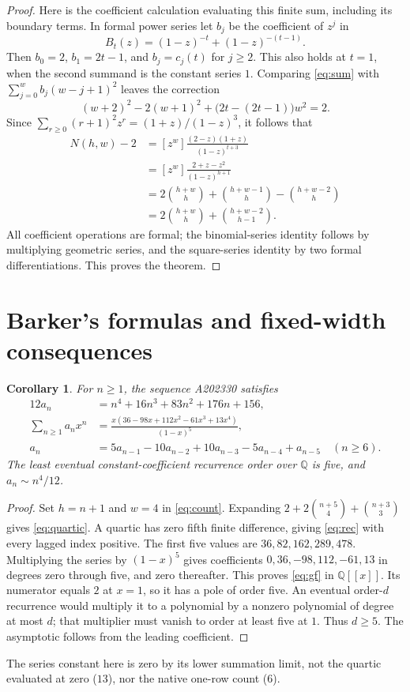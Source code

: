 \documentclass[11pt]{article}
\newtheorem{corollary}[theorem]{Corollary}
\newcommand{\bin}[2]{\binom{#1}{#2}}
\begin{document}
\begin{proof}
Here is the coefficient calculation evaluating this finite sum, including its boundary terms. In formal power series let $b_j$ be the coefficient of $z^j$ in
\[
 B_t(z)=(1-z)^{-t}+(1-z)^{-(t-1)}.
\]
Then $b_0=2$, $b_1=2t-1$, and $b_j=c_j(t)$ for $j\ge2$. This also holds at $t=1$, when the second summand is the constant series $1$. Comparing \eqref{eq:sum} with $\sum_{j=0}^w b_j(w-j+1)^2$ leaves the correction
\[
 (w+2)^2-2(w+1)^2+\bigl(2t-(2t-1)\bigr)w^2=2.
\]
Since $\sum_{r\ge0}(r+1)^2z^r=(1+z)/(1-z)^3$, it follows that
\begin{align*}
 N(h,w)-2
  &=[z^w]\frac{(2-z)(1+z)}{(1-z)^{t+3}}\\
  &=[z^w]\frac{2+z-z^2}{(1-z)^{h+1}}\\
  &=2\bin{h+w}{h}+\bin{h+w-1}{h}-\bin{h+w-2}{h}\\
  &=2\bin{h+w}{h}+\bin{h+w-2}{h-1}.
\end{align*}
All coefficient operations are formal; the binomial-series identity follows by multiplying geometric series, and the square-series identity by two formal differentiations. This proves the theorem.
\end{proof}

\section{Barker's formulas and fixed-width consequences}
\begin{corollary}\label{cor:four}
For $n\ge1$, the sequence A202330 satisfies
\begin{align}
12a_n&=n^4+16n^3+83n^2+176n+156,\label{eq:quartic}\\
\sum_{n\ge1}a_nx^n
 &=\frac{x(36-98x+112x^2-61x^3+13x^4)}{(1-x)^5},\label{eq:gf}\\
a_n&=5a_{n-1}-10a_{n-2}+10a_{n-3}-5a_{n-4}+a_{n-5}
 \quad(n\ge6).\label{eq:rec}
\end{align}
The least eventual constant-coefficient recurrence order over $\mathbb Q$ is five, and $a_n\sim n^4/12$.
\end{corollary}
\begin{proof}
Set $h=n+1$ and $w=4$ in \eqref{eq:count}. Expanding
$2+2\bin{n+5}{4}+\bin{n+3}{3}$ gives \eqref{eq:quartic}. A quartic has zero fifth finite difference, giving \eqref{eq:rec} with every lagged index positive. The first five values are $36,82,162,289,478$. Multiplying the series by $(1-x)^5$ gives coefficients $0,36,-98,112,-61,13$ in degrees zero through five, and zero thereafter. This proves \eqref{eq:gf} in $\mathbb Q[[x]]$. Its numerator equals $2$ at $x=1$, so it has a pole of order five. An eventual order-$d$ recurrence would multiply it to a polynomial by a nonzero polynomial of degree at most $d$; that multiplier must vanish to order at least five at $1$. Thus $d\ge5$. The asymptotic follows from the leading coefficient.
\end{proof}
The series constant here is zero by its lower summation limit, not the quartic evaluated at zero ($13$), nor the native one-row count ($6$).
\end{document}
